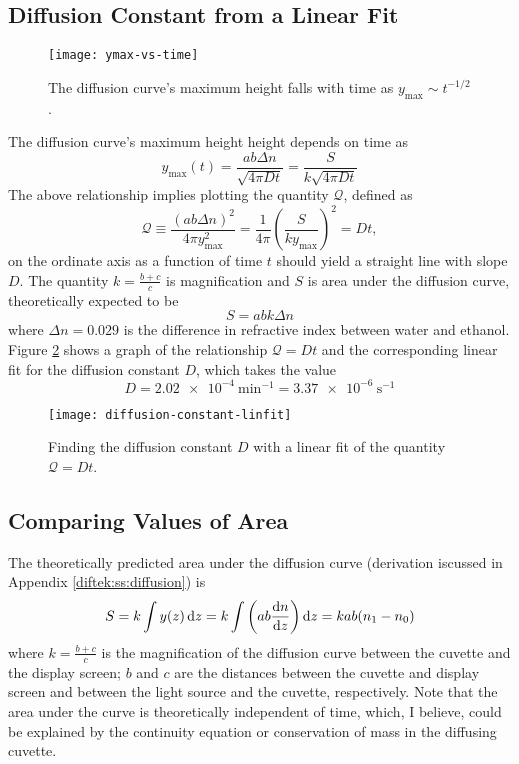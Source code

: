 \documentclass[11pt, a4paper]{article}
\newcommand{\diff}{\mathop{}\!\mathrm{d}} %
\begin{document}
\subsection{Diffusion Constant from a Linear Fit} 
\label{diftek:ss:linfit}

\begin{figure}[htb!]
\texttt{[image: ymax-vs-time]}
\caption{The diffusion curve's maximum height falls with time as $ y_{\text{max}} \sim t^{-1/2} $.}
\label{diftek:fig:ymax}
\end{figure}

The diffusion curve's maximum height height depends on time as
\begin{equation*}
	y_{\text{max}}(t) = \frac{ab\Delta n}{\sqrt{4\pi D t}} = \frac{S}{k\sqrt{4\pi D t}}
\end{equation*}
The above relationship implies plotting the quantity $ \mathcal{Q} $, defined as
\begin{equation*}
	\mathcal{Q} \equiv \frac{(ab\Delta n)^{2}}{4\pi y_{\text{max}}^{2}} = \frac{1}{4\pi}\left(\frac{S}{ky_{\text{max}}}\right)^{2} = Dt,
\end{equation*}
on the ordinate axis as a function of time $ t $ should yield a straight line with slope $ D $. The quantity $ k = \frac{b + c}{c} $ is magnification and $ S $ is area under the diffusion curve, theoretically expected to be 
\begin{equation*}
	S = abk \Delta n 
\end{equation*}
where $ \Delta n = 0.029 $ is the difference in refractive index between water and ethanol. Figure \ref{diftek:fig:D-linfit} shows a graph of the relationship $ \mathcal{Q} = Dt $ and the corresponding linear fit for the diffusion constant $ D $, which takes the value
\begin{equation*}
	D = \SI{2.02e-4}{\minute^{-1}} = \SI{3.37e-6}{\second^{-1}}
\end{equation*}


\begin{figure}
\texttt{[image: diffusion-constant-linfit]}
\caption{Finding the diffusion constant $ D $ with a linear fit of the quantity $ \mathcal{Q} = Dt $.}
\label{diftek:fig:D-linfit}
\end{figure}

\subsection{Comparing Values of Area}
The theoretically predicted area under the diffusion curve (derivation iscussed in Appendix \ref{diftek:ss:diffusion}) is
\begin{equation*}
	S = k\int y(z) \diff z = k\int \left(ab \dv{n}{z}\right)\diff z = k ab (n_{1}- n_{0})
\end{equation*}
where $ k = \frac{b+c}{c} $ is the magnification of the diffusion curve between the cuvette and the display screen; $ b $ and $ c $ are the distances between the cuvette and display screen and between the light source and the cuvette, respectively. Note that the area under the curve is theoretically independent of time, which, I believe, could be explained by the continuity equation or conservation of mass in the diffusing cuvette. 
\end{document}
